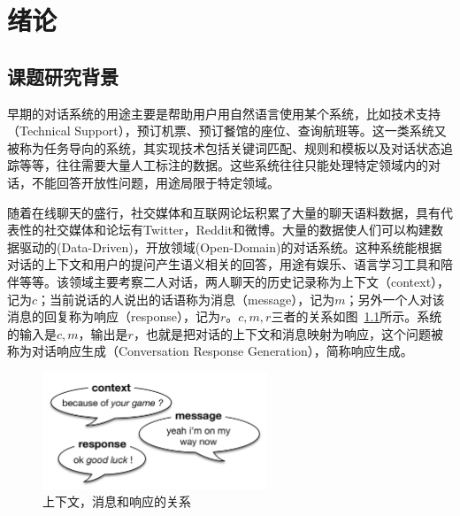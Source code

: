 
\chapter{绪论}\label{ch:绪论}

\section{课题研究背景}\label{sec:课题研究背景}
早期的对话系统的用途主要是帮助用户用自然语言使用某个系统，比如技术支持（Technical Support），预订机票、预订餐馆的座位、查询航班等。这一类系统又被称为任务导向的系统，其实现技术包括关键词匹配、规则和模板以及对话状态追踪等等，往往需要大量人工标注的数据。这些系统往往只能处理特定领域内的对话，不能回答开放性问题，用途局限于特定领域。

随着在线聊天的盛行，社交媒体和互联网论坛积累了大量的聊天语料数据，具有代表性的社交媒体和论坛有Twitter，Reddit和微博。大量的数据使人们可以构建数据驱动的(Data-Driven)，开放领域(Open-Domain)的对话系统。这种系统能根据对话的上下文和用户的提问产生语义相关的回答，用途有娱乐、语言学习工具和陪伴等等。该领域主要考察二人对话，两人聊天的历史记录称为上下文（context），记为$c$；当前说话的人说出的话语称为消息（message），记为$m$；另外一个人对该消息的回复称为响应（response），记为$r$。$c,m,r$三者的关系如图~\ref{fig:context_message_response}所示。系统的输入是$c,m$，输出是$r$，也就是把对话的上下文和消息映射为响应，这个问题被称为对话响应生成（Conversation Response Generation），简称响应生成。

\begin{figure}[H]
    \includegraphics[width=0.6\textwidth]{figure/context_message_response.png}
    \centering
    \caption{上下文，消息和响应的关系}
    \label{fig:context_message_response}
\end{figure}

